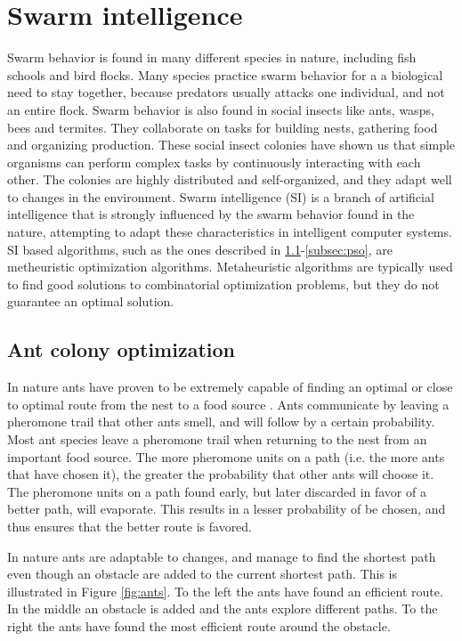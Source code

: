 \section{Swarm intelligence}
\label{sec:swarmIntelligence}
Swarm behavior is found in many different species in nature, including fish schools and bird flocks. Many species practice swarm behavior for a a biological need to stay together, because predators usually attacks one individual, and not an entire flock. Swarm behavior is also found in social insects like ants, wasps, bees and termites. They collaborate on tasks for building nests, gathering food and organizing production. These social insect colonies have shown us that simple organisms can perform complex tasks by continuously interacting with each other. The colonies are highly distributed and self-organized, and they adapt well to changes in the environment. Swarm intelligence (SI) \citep{beni89} is a branch of artificial intelligence that is strongly influenced by the swarm behavior found in the nature, attempting to adapt these characteristics in intelligent computer systems. SI based algorithms, such as the ones described in \ref{subsec:aco}-\ref{subsec:pso}, are metheuristic optimization algorithms. Metaheuristic algorithms are typically used to find good solutions to combinatorial optimization problems, but they do not guarantee an optimal solution. 

\subsection{Ant colony optimization}
\label{subsec:aco}
In nature ants have proven to be extremely capable of finding an optimal or close to optimal route from the nest to a food source \citep{deneubourg90}. Ants communicate by leaving a pheromone trail that other ants smell, and will follow by a certain probability. Most ant species leave a pheromone trail when returning to the nest from an important food source. The more pheromone units on a path (i.e. the more ants that have chosen it), the greater the probability that other ants will choose it. The pheromone units on a path found early, but later discarded in favor of a better path, will evaporate. This results in a lesser probability of be chosen, and thus ensures that the better route is favored. 

In nature ants are adaptable to changes, and manage to find the shortest path even though an obstacle are added to the current shortest path. This is illustrated in Figure \ref{fig:ants}. To the left the ants have found an efficient route. In the middle an obstacle is added and the ants explore different paths. To the right the ants have found the most efficient route around the obstacle.

